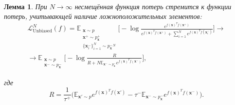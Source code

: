\documentclass[a4paper, 14pt]{article}
\newtheorem{lemma}{Лемма}
\begin{document}
\begin{lemma}
\label{lemm:asympt}
При $N \to \infty$ несмещённая функция потерь стремится к функции потерь, учитывающей наличие ложноположительных элементов:
\begin{equation} \label{eq:8}
\begin{split}
\mathcal{L}_{\text{Unbiased}}^N(f) = \mathbb{E}_{\substack{\mathbf{x} \sim p \\ \mathbf{x}^+ \sim p_\mathbf{x}^+ \\ \{\mathbf{x}_i^-\}_{i=1}^N \sim {p_\mathbf{x}^-}^N}} \bigg[ - \log \frac{e^{f(\mathbf{x})^T f(\mathbf{x}^+)}}{e^{f(\mathbf{x})^T f(\mathbf{x}^+)} + \sum_{i=1}^N e^{f(\mathbf{x})^T f(\mathbf{x}_i^-)}} \bigg] \longrightarrow \\
\longrightarrow \mathbb{E}_{\substack{\mathbf{x} \sim p \\ \mathbf{x}^- \sim p_\mathbf{x}^-}} \bigg[ - \log \frac{R}{R + N \mathbb{E}_{\mathbf{x}^- \sim p_\mathbf{x}^-} e^{f(\mathbf{x})^T f(\mathbf{x}^-)}} \bigg],
\end{split}
\end{equation}

\noindent где
\begin{equation}\label{eq:9}
R = \frac{1}{\tau^+} \big(\mathbb{E}_{\mathbf{x}' \sim p} e^{f(\mathbf{x})^T f(\mathbf{x}')} - \tau^- \mathbb{E}_{\mathbf{x}^- \sim p_\mathbf{x}^-} e^{f(\mathbf{x})^T f(\mathbf{x}^-)}\big).
\end{equation}
\end{lemma}
\end{document}
